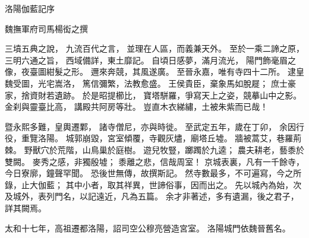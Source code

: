 \begin{guji}[30]
洛陽伽藍記序

\begin{flushright}
魏撫軍府司馬楊衒之撰
\end{flushright}

三墳五典之說，
九流百代之言，
並理在人區，而義兼天外。
至於一乘二諦之原，
三明六通之旨，
西域備詳，東土靡記。
自頃日感夢，滿月流光，
陽門飾毫眉之像，夜臺圖紺髮之形。
邇來奔競，其風遂廣。
至晉永嘉，唯有寺四十二所。
逮皇魏受圖，光宅嵩洛，
篤信彌繁，法教愈盛。
王侯貴臣，棄象馬如脫屣；
庶士豪家，捨資財若遺跡。
於是昭提櫛比，
寶塔駢羅，爭寫天上之姿，競摹山中之影。
金刹與靈臺比高，
講殿共阿房等壯。
豈直木衣綈繡，土被朱紫而已哉！

暨永熙多難，皇輿遷鄴，
諸寺僧尼，亦與時徙。
至武定五年，歲在丁卯，
余因行役，重覽洛陽。
城郭崩毀，宮室傾覆，寺觀灰燼，廟塔丘墟。
牆被蒿艾，巷羅荊棘。
野獸穴於荒階，山鳥巢於庭樹。
遊兒牧豎，躑躅於九逵；
農夫耕老，藝黍於雙闕。
麥秀之感，非獨殷墟；
黍離之悲，信哉周室！
京城表裏，凡有一千餘寺，今日寮廓，鐘聲罕聞。
恐後世無傳，故撰斯記。
然寺數最多，不可遍寫，今之所錄，止大伽藍；
其中小者，取其祥異，世諦俗事，因而出之。
先以城內為始，次及城外，表列門名，以記遠近，凡為五篇。
余才非著述，多有遺漏，後之君子，詳其闕焉。

太和十七年，高祖遷都洛陽，詔司空公穆亮營造宮室。
洛陽城門依魏晉舊名。


\end{guji}
